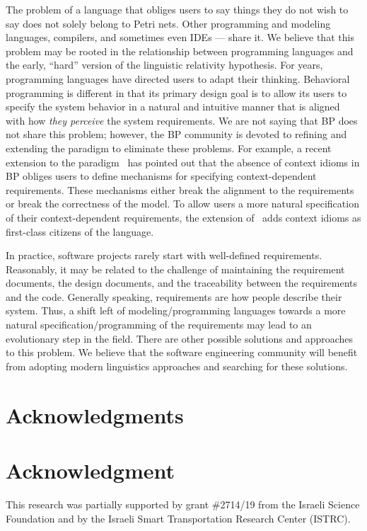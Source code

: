 \documentclass[10pt,journal,compsoc]{IEEEtran}
\theoremstyle{definition}
\begin{document}
The problem of a language that obliges users to say things they do not wish to say does not solely belong to Petri nets. Other programming and modeling languages, compilers, and sometimes even IDEs --- share it. We believe that this problem may be rooted in the relationship between programming languages and the early, ``hard'' version of the linguistic relativity hypothesis. For years, programming languages have directed users to adapt their thinking. Behavioral programming is different in that its primary design goal is to allow its users to specify the system behavior in a natural and intuitive manner that is aligned with how \textit{they perceive} the system requirements. We are not saying that BP does not share this problem; however, the BP community is devoted to refining and extending the paradigm to eliminate these problems. For example, a recent extension to the paradigm~\cite{Elyasaf2020COBP} has pointed out that the absence of context idioms in BP obliges users to define mechanisms for specifying context-dependent requirements. These mechanisms either break the alignment to the requirements or break the correctness of the model. To allow users a more natural specification of their context-dependent requirements, the extension of~\cite{Elyasaf2020COBP} adds context idioms as first-class citizens of the language. 

In practice, software projects rarely start with well-defined requirements. Reasonably, it may be related to the challenge of maintaining the requirement documents, the design documents, and the traceability between the requirements and the code. Generally speaking, requirements are how people describe their system. Thus, a shift left of modeling/programming languages towards a more natural specification/programming of the requirements may lead to an evolutionary step in the field. There are other possible solutions and approaches to this problem. We believe that the software engineering community will benefit from adopting modern linguistics approaches and searching for these solutions.

\ifCLASSOPTIONcompsoc
  \section*{Acknowledgments}
\else
  \section*{Acknowledgment}
\fi
This research was partially supported by grant \#2714/19 from the Israeli Science Foundation and by the Israeli Smart Transportation Research Center (ISTRC). 
\end{document}
